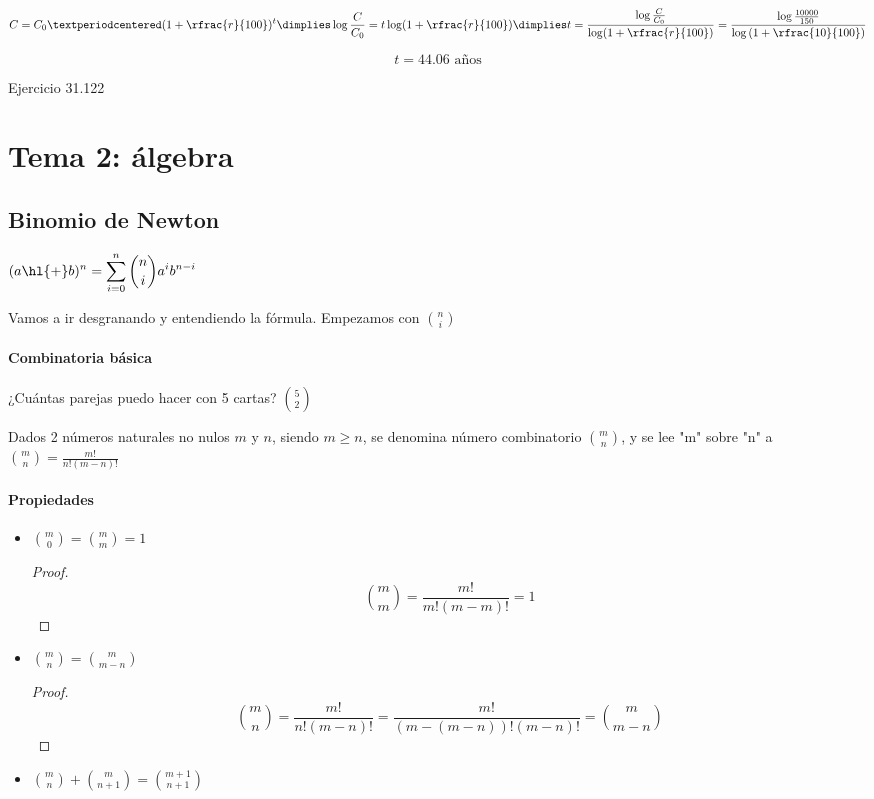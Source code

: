 \[
	C = C_0·(1+\rfrac{r}{100})^{t} \dimplies \log\frac{C}{C_0} = t\log(1+\rfrac{r}{100}) \dimplies t = \frac{\log\frac{C}{C_0}}{\log(1+\rfrac{r}{100})} = \frac{\log\frac{10000}{150}}{\log\left(1+\rfrac{10}{100}\right)} 
\]

\[
	t = 44.06\text{ años}
\]

Ejercicio 31.122

\section{Tema 2: álgebra}

\subsection{Binomio de Newton}

$
\displaystyle (a\text{\hl{+}}b)^n = \sum_{i=0}^n \binom{n}{i} a^ib^{n-i}
$

Vamos a ir desgranando y entendiendo la fórmula. Empezamos con $\binom{n}{i}$

\paragraph{Combinatoria básica} ¿Cuántas parejas puedo hacer con 5 cartas? $\binom{5}{2}$

\begin{defn} Dados 2 números naturales no nulos $m$ y $n$, siendo $m≥n$, se denomina número combinatorio $\binom{m}{n}$, y se lee "m" sobre "n" a $\binom{m}{n} = \frac{m!}{n!(m-n)!}$
\end{defn}

\paragraph{Propiedades}
\begin{itemize}
	\item $\binom{m}{0}=\binom{m}{m}=1$
	\begin{proof}
		\[\binom{m}{m} = \frac{m!}{m!(m-m)!} = 1\]
	\end{proof}
	\item $\binom{m}{n}=\binom{m}{m-n}$ 
	\begin{proof}
		\[\binom{m}{n} = \frac{m!}{n!(m-n)!} = \frac{m!}{(m-(m-n))!(m-n)!} = \binom{m}{m-n} \]
	\end{proof}
	\item $\binom{m}{n} + \binom{m}{n+1}=\binom{m+1}{n+1}$
\end{itemize}

